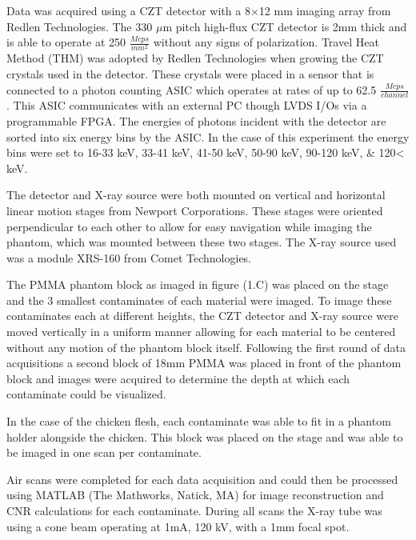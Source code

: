 \documentclass[a4paper,11pt]{article}
\begin{document}
Data was acquired using a CZT detector with a 8$\times$12 mm imaging array from Redlen Technologies. The 330 $\mu$m pitch high-flux CZT detector is 2mm thick and is able to operate at 250 $\frac{Mcps}{mm^2}$ without any signs of polarization. Travel Heat Method (THM) was adopted by Redlen Technologies when growing the CZT crystals used in the detector. These crystals were placed in a sensor that is connected to a photon counting ASIC which operates at rates of up to 62.5 $\frac{Mcps}{channel}$. This ASIC communicates with an external PC though LVDS I/Os via a programmable FPGA. The energies of photons incident with the detector are sorted into six energy bins by the ASIC. In the case of this experiment the energy bins were set to 16-33 keV, 33-41 keV, 41-50 keV, 50-90 keV, 90-120 keV, \& 120< keV.

The detector and X-ray source were both mounted on vertical and horizontal linear motion stages from Newport Corporations. These stages were oriented perpendicular to each other to allow for easy navigation while imaging the phantom, which was mounted between these two stages. The X-ray source used was a module XRS-160 from Comet Technologies. 

The PMMA phantom block as imaged in figure (1.C) was placed on the stage and the 3 smallest contaminates of each material were imaged. To image these contaminates each at different heights, the CZT detector and X-ray source were moved vertically in a uniform manner allowing for each material to be centered without any motion of the phantom block itself. Following the first round of data acquisitions a second block of 18mm PMMA was placed in front of the phantom block and images were acquired to determine the depth at which each contaminate could be visualized. 

In the case of the chicken flesh, each contaminate was able to fit in a phantom holder alongside the chicken. This block was placed on the stage and was able to be imaged in one scan per contaminate. 

Air scans were completed for each data acquisition and could then be processed using MATLAB (The Mathworks, Natick, MA) for image reconstruction and CNR calculations for each contaminate. During all scans the X-ray tube was using a cone beam operating at 1mA, 120 kV, with a 1mm focal spot. 
\end{document}
